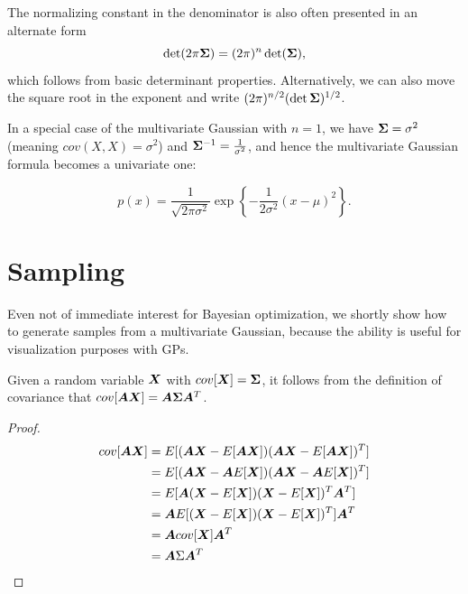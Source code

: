\begin{rem}
  The normalizing constant in the denominator is also often presented in an alternate
  form $$\det(2 \pi {\bm{\Sigma}}) = (2\pi)^n \det({\bm{\Sigma}}),$$ which follows from basic
  determinant properties. Alternatively, we can also move the square root in the
  exponent and write $(2 \pi)^{n/2} (\det {\bm{\Sigma}})^{1/2}$.
\end{rem}

\begin{rem}
  In a special case of the multivariate Gaussian with $n = 1$, we have
  ${\bm{\Sigma}} = \sigma^2$ (meaning $cov(X, X) = \sigma^2$) and ${\bm{\Sigma}}^{-1} =
  \frac{1}{\sigma^2}$, and hence the multivariate Gaussian formula becomes
  a univariate one:

  \begin{equation}
    p(x) = \frac{1}{\sqrt{2 \pi \sigma^2}} \exp{\left\{ - \frac{1}{2\sigma^2} (x - \mu)^2 \right\}}.
  \end{equation}
\end{rem}

\section{Sampling}

Even not of immediate interest for Bayesian optimization, we shortly show
how to generate samples from a multivariate Gaussian, because the ability is useful for
visualization purposes with GPs.

\begin{thm}
  Given a random variable ${\bm{X}}$ with $cov[{\bm{X}}] = {\bm{\Sigma}}$, it follows from
  the definition of covariance that $cov[{\bm{A}} {\bm{X}}] = {\bm{A}} {\bm{\Sigma}} {\bm{A}}^T$.
\end{thm}

\begin{proof}
  \begin{align}
    cov[{\bm{A}} {\bm{X}}] &= E[({\bm{A}} {\bm{X}} - E[{\bm{A}} {\bm{X}}])({\bm{A}} {\bm{X}} - E[{\bm{A}} {\bm{X}}])^T] \\
                 &= E[({\bm{A}} {\bm{X}} - {\bm{A}} E[{\bm{X}}])({\bm{A}} {\bm{X}} - {\bm{A}} E[{\bm{X}}])^T] \\
                 &= E[{\bm{A}} ({\bm{X}} - E[{\bm{X}}])({\bm{X}} - E[{\bm{X}}])^T {\bm{A}}^T] \\
                 &= {\bm{A}} E[({\bm{X}} - E[{\bm{X}}])({\bm{X}} - E[{\bm{X}}])^T] {\bm{A}}^T \\
                 &= {\bm{A}} cov[{\bm{X}}] {\bm{A}}^T \\
                 &= {\bm{A}} \Sigma {\bm{A}}^T
    \label{eq:gaussian-ax}
  \end{align}
\end{proof}

